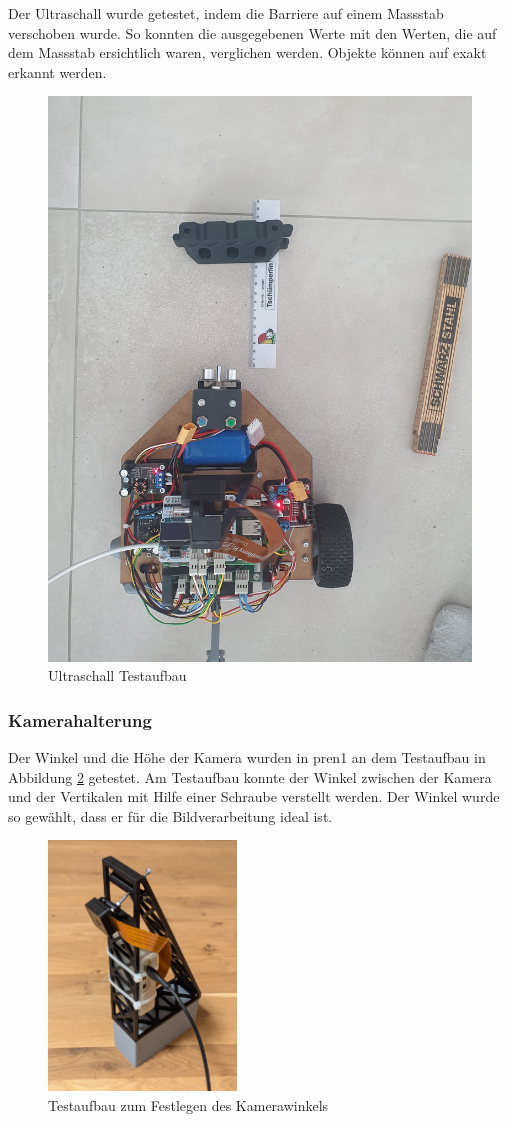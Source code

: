 Der Ultraschall wurde getestet, indem die Barriere auf einem Massstab verschoben wurde. So konnten die ausgegebenen Werte mit den Werten, die auf dem Massstab ersichtlich waren, verglichen werden. Objekte können auf \pm 1cm exakt erkannt werden.

\begin{figure}[H]
    \centering
    \includegraphics[width=0.5\linewidth]{assets/ET/ultraschall/ultraschall-test.jpg}
    \caption{Ultraschall Testaufbau}
    \label{fig:ultraschall-tests}
\end{figure}

\subsubsection{Kamerahalterung}
\label{Kamera Halter}

Der Winkel und die Höhe der Kamera wurden in \acrshort{pren1} an dem Testaufbau in Abbildung \ref{fig:Testaufbau zum Festlegen des Kamerawinkels} getestet. Am Testaufbau konnte der Winkel zwischen der Kamera und der Vertikalen mit Hilfe einer Schraube verstellt werden. Der Winkel wurde so gewählt, dass er für die Bildverarbeitung ideal ist. 

\begin{figure}[H]
\centering
\includegraphics[width=5cm]{assets/MT/camer_tower_2.png}
\caption{Testaufbau zum Festlegen des Kamerawinkels}
\label{fig:Testaufbau zum Festlegen des Kamerawinkels}
\end{figure}


